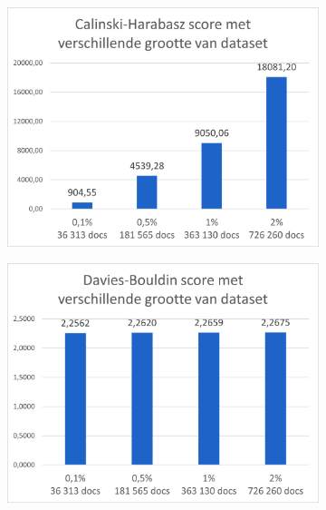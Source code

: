 \begin{figure}[H]
    \begin{subfigure}{.5\textwidth}
        \centering
        \includegraphics[width=1\linewidth]{fig/chapt4/NLP/cal_data.png}
    \end{subfigure}
    \begin{subfigure}{.5\textwidth}
        \centering
        \includegraphics[width=1\linewidth]{fig/chapt4/NLP/davies_data.png}
    \end{subfigure}
    

\end{figure}
